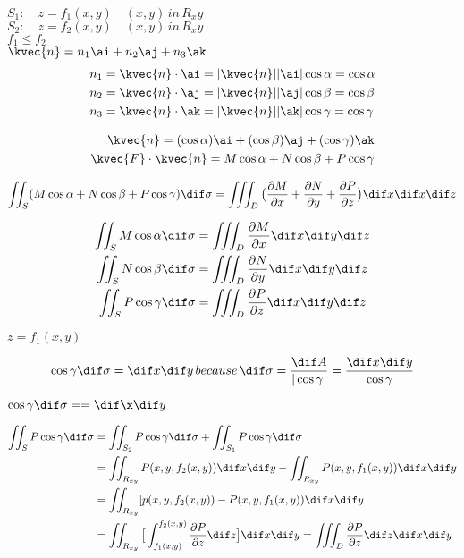 \( S_1 : \quad z= f_1 (x,y) \quad (x,y) \, in \,  R_xy \) \\
\( S_2 : \quad z= f_2 (x,y) \quad (x,y) \, in \,  R_xy \) \\
\( f_1 \le f_2 \) \\

\( \kvec{n} = n_1 \ai + n_2 \aj + n_3 \ak \) \\

\begin{align*}
n_1 &= \kvec{n} \cdot \ai = | \kvec{n} ||\ai| \cos \alpha = \cos \alpha \\
n_2 &= \kvec{n} \cdot \aj = | \kvec{n} ||\aj| \cos \beta = \cos \beta \\
n_3 &= \kvec{n} \cdot \ak = | \kvec{n} ||\ak| \cos \gamma = \cos\gamma
\end{align*}

\begin{align*}
\kvec{n} = (\cos \alpha) \ai + (\cos\beta)\aj +(\cos\gamma)\ak \\
\kvec{F} \cdot \kvec{n} = M\cos\alpha + N \cos\beta +P \cos\gamma
\end{align*}


\begin{align*}
\iint_S (M \cos\alpha + N \cos \beta + P \cos \gamma) \dif \sigma = \iiint_D \big( \frac{\partial M}{\partial x} + \frac{\partial N}{\partial y} + \frac{\partial P}{\partial z} \big) \dif x \dif x \dif z
\end{align*}

\begin{align}
\iint_S M \cos \alpha\dif \sigma &=  \iiint_D \frac{\partial M}{\partial x} \dif x \dif y \dif z \\
\iint_S N \cos \beta \dif \sigma &= \iiint_D \frac{\partial N}{\partial y} \dif x \dif y \dif z \\
\iint_S P \cos \gamma \dif\sigma &= \iiint_D \frac{\partial P}{\partial z} \dif x \dif y \dif z
\end{align}

\( z= f_1 (x,y) \)

\begin{align*}
\cos\gamma \dif \sigma = \dif x \dif y \, because \, \dif \sigma = \frac{\dif A}{| \cos\gamma|}= \frac{\dif x \dif y}{\cos\gamma} 
\end{align*}

\( \cos \gamma \dif \sigma = = \dif \x \dif y \) 

\begin{align*}
\iint_S P \cos \gamma \dif \sigma &= \iint_{S_{2}} P \cos \gamma \dif \sigma + \iint_{S_{1}} P \cos \gamma \dif \sigma \\
&= \iint_{R_{xy}} P (x,y, f_2 (x,y)) \dif x \dif y - \iint_{R_{xy}} P (x, y, f_1 (x,y)) \dif x \dif y \\
&= \iint_{R_{xy}} [ p(x,y, f_2 (x,y)) - P (x,y, f_1 (x,y)) \dif x \dif y \\
&= \iint_{R_{xy}} \big[ \int_{f_1 (x,y)}^{f_2 (x,y) } \frac{\partial P}{\partial z} \dif z \big] \dif x \dif y = \iiint_D \frac{\partial P}{\partial z} \dif z \dif x \dif y 
\end{align*}

